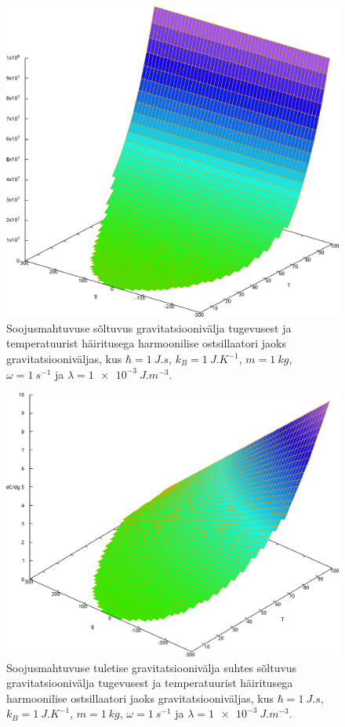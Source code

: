 \documentclass{trkut}%
\begin{document}
\begin{figure}[htb!]
    \includegraphics[width=\textwidth]{maxima/harh1k1m1w1l0001.pdf}
    \caption{Soojusmahtuvuse sõltuvus gravitatsioonivälja tugevusest ja temperatuurist häiritusega harmoonilise ostsillaatori jaoks gravitatsiooniväljas, kus $\hbar=\SI{1}{J.s}$, $k_B=\SI{1}{J.K^{-1}}$, $m=\SI{1}{kg}$, $\omega=\SI{1}{s^{-1}}$ ja $\lambda=\SI{1e-3}{J.m^{-3}}$.}
    \label{hjoon1}
\end{figure}

\begin{figure}[htb!]
    \includegraphics[width=\textwidth]{maxima/dcdgharh1k1m1w1l0001.pdf}
    \caption{Soojusmahtuvuse tuletise gravitatsioonivälja suhtes sõltuvus gravitatsioonivälja tugevusest ja temperatuurist häiritusega harmoonilise ostsillaatori jaoks gravitatsiooniväljas, kus $\hbar=\SI{1}{J.s}$, $k_B=\SI{1}{J.K^{-1}}$, $m=\SI{1}{kg}$, $\omega=\SI{1}{s^{-1}}$ ja $\lambda=\SI{1e-3}{J.m^{-3}}$.} %
    \label{hjoon2}
\end{figure}
\end{document}

